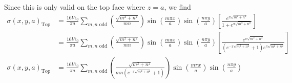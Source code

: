 \documentclass{article}
\begin{document}
Since this is only valid on the top face where $z=a$, we find
\begin{align*}
\sigma(x,y,a)_{\text{Top}} &= \frac{ 16V\epsilon_{0} }{ \pi a } \sum_{m,n \text{ odd}} \left( \frac{ \sqrt{m^{2} + n^{2}} }{ mn } \right) \sin\left(\frac{ m\pi x }{ a }\right) \sin\left(\frac{ n\pi y }{ a }\right) \left[ \frac{ e^{\pi\sqrt{m^{2} + n^{2}}} }{ 1 + e^{\pi\sqrt{m^{2} + n^{2}}} } \right]\\
&= \frac{ 16V\epsilon_{0} }{ \pi a } \sum_{m,n \text{ odd}} \left( \frac{ \sqrt{m^{2} + n^{2}} }{ mn } \right) \sin\left(\frac{ m\pi x }{ a }\right) \sin\left(\frac{ n\pi y }{ a }\right) \left[ \frac{ e^{\pi\sqrt{m^{2} + n^{2}}} }{ \left( e^{-\pi\sqrt{m^{2} + n^{2}}} + 1 \right) e^{\pi\sqrt{m^{2} + n^{2}}} } \right]\\
\sigma(x,y,a)_{\text{Top}} &= \boxed{ \frac{ 16V\epsilon_{0} }{ \pi a } \sum_{m,n \text{ odd}} \left( \frac{ \sqrt{m^{2} + n^{2}} }{ mn \left( e^{-\pi\sqrt{m^{2} + n^{2}}} + 1 \right)} \right) \sin\left(\frac{ m\pi x }{ a }\right) \sin\left(\frac{ n\pi y }{ a }\right) }\\
\end{align*}
\end{document}
